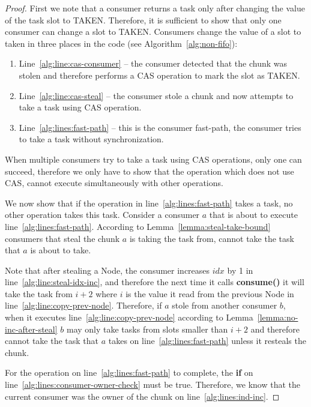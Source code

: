 \begin{proof}
First we note that a consumer returns a task only after changing the value of the task slot to TAKEN. 
Therefore, it is sufficient to show that only one consumer can change a slot to TAKEN.
Consumers change the value of a slot to taken in three places in the code (see Algorithm~\ref{alg:non-fifo}):
\begin{enumerate}
 \item Line~\ref{alg:line:cas-consumer} -- the consumer detected that the chunk was stolen and therefore performs a CAS operation to mark the slot as TAKEN.
 \item Line~\ref{alg:line:cas-steal} -- the consumer stole a chunk and now attempts to take a task using CAS operation.
 \item Line~\ref{alg:lines:fast-path} -- this is the consumer fast-path, the consumer tries to take a task without synchronization.
\end{enumerate}

When multiple consumers try to take a task using CAS operations, only one can succeed, therefore we only have to show that the operation which does not use CAS, cannot execute simultaneously with other operations.

We now show that if the operation in line~\ref{alg:lines:fast-path} takes a task, no other operation takes this task. 
Consider a consumer $a$ that is about to execute line~\ref{alg:lines:fast-path}.
According to Lemma~\ref{lemma:steal-take-bound} consumers that steal the chunk $a$ is taking the task from, cannot take the task that $a$ is about to take.

Note that after stealing a Node, the consumer increases $idx$ by 1 in line~\ref{alg:line:steal-idx-inc}, and therefore the next time it calls {\bf consume()} it will take the task from $i+2$ where $i$ is the value it read from the previous Node in line~\ref{alg:line:copy-prev-node}. Therefore, if $a$ stole from another consumer $b$, when it executes line~\ref{alg:line:copy-prev-node} according to Lemma~\ref{lemma:no-inc-after-steal} $b$ may only take tasks from slots smaller than $i+2$ and therefore cannot take the task that $a$ takes on line~\ref{alg:lines:fast-path} unless it resteals the chunk. 

For the operation on line~\ref{alg:lines:fast-path} to complete, the {\bf if} on line~\ref{alg:lines:consumer-owner-check} must be true. Therefore, we know that the current consumer was the owner of the chunk on line~\ref{alg:lines:ind-inc}.

\end{proof}
